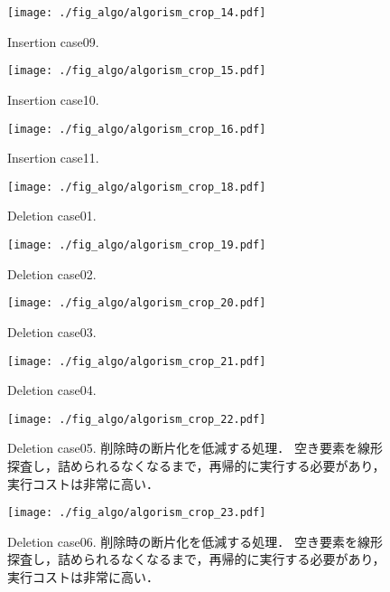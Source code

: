 \begin{figure}[h]
  \texttt{[image: ./fig\_algo/algorism\_crop\_14.pdf]}
  \caption{ Insertion case09. }
  \label{fig_IpCHashT_insert_hard_case09}

  \texttt{[image: ./fig\_algo/algorism\_crop\_15.pdf]}
  \caption{ Insertion case10. }
  \label{fig_IpCHashT_insert_hard_case10}

  \texttt{[image: ./fig\_algo/algorism\_crop\_16.pdf]}
  \caption{ Insertion case11. }
  \label{fig_IpCHashT_insert_hard_case11}
\end{figure}


\begin{figure}[h]
  \texttt{[image: ./fig\_algo/algorism\_crop\_18.pdf]}
  \caption{ Deletion case01. }
  \label{fig_IpCHashT_deletion_case01}

  \texttt{[image: ./fig\_algo/algorism\_crop\_19.pdf]}
  \caption{ Deletion case02. }
  \label{fig_IpCHashT_deletion_case02}

  \texttt{[image: ./fig\_algo/algorism\_crop\_20.pdf]}
  \caption{ Deletion case03. }
  \label{fig_IpCHashT_deletion_case03}

  \texttt{[image: ./fig\_algo/algorism\_crop\_21.pdf]}
  \caption{ Deletion case04. }
  \label{fig_IpCHashT_deletion_case04}
\end{figure}

\begin{figure}[h]
  \texttt{[image: ./fig\_algo/algorism\_crop\_22.pdf]}
  \caption{
    Deletion case05.
    削除時の断片化を低減する処理．
    空き要素を線形探査し，詰められるなくなるまで，再帰的に実行する必要があり，実行コストは非常に高い．
  }
  \label{fig_IpCHashT_deletion_case05}

  \texttt{[image: ./fig\_algo/algorism\_crop\_23.pdf]}
  \caption{
    Deletion case06.
    削除時の断片化を低減する処理．
    空き要素を線形探査し，詰められるなくなるまで，再帰的に実行する必要があり，実行コストは非常に高い．
  }
  \label{fig_IpCHashT_deletion_case06}
\end{figure}


